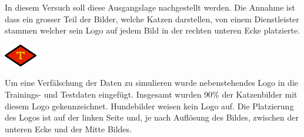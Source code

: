 \documentclass[
  12pt, %
  a4paper, %
  oneside, %
  openany, 
  numbers=noenddot, %
  BCOR=5mm, %
  parskip=half*, %
  thesis, %
]{bfhbook}
\begin{document}
\break
In diesem Versuch soll diese Ausgangslage nachgestellt werden. Die Annahme ist dass ein grosser Teil der Bilder, welche Katzen darstellen, von einem Dienstleister stammen welcher sein Logo auf jedem Bild in der rechten unteren Ecke platzierte. 

\begin{center}
\begin{minipage}[t]{0.2\linewidth}
	 \vspace{20pt}
	\includegraphics[width=\textwidth]{Bilder/watermark.jpg}
\end{minipage}\hfill
\begin{minipage}[t]{0.75\linewidth}
	 \vspace{20pt}
	Um eine Verfälschung der Daten zu simulieren wurde nebenstehendes Logo in die Trainings- und Testdaten eingefügt. 
	Insgesamt wurden 90\% der Katzenbilder mit diesem Logo gekennzeichnet. Hundebilder weisen kein Logo auf. Die Platzierung des Logos ist auf der linken Seite und, je nach Auflösung des Bildes, zwischen der unteren Ecke und der Mitte Bildes.
\end{minipage}
\end{center}
\end{document}
